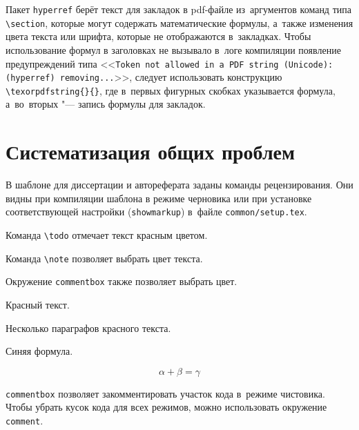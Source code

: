 Пакет \texttt{hyperref} берёт текст для закладок в pdf-файле из~аргументов
команд типа \verb|\section|, которые могут содержать математические формулы,
а~также изменения цвета текста или шрифта, которые не отображаются в~закладках.
Чтобы использование формул в заголовках не вызывало в~логе компиляции появление
предупреждений типа <<\texttt{Token not allowed in~a~PDF string
    (Unicode):(hyperref) removing...}>>, следует использовать конструкцию
\verb|\texorpdfstring{}{}|, где в~первых фигурных скобках указывается
формула, а~во~вторых "--- запись формулы для закладок.

\section{Систематизация общих проблем}\label{sec:markup}

В шаблоне для диссертации и автореферата заданы команды рецензирования.
Они видны при компиляции шаблона в режиме черновика или при установке
соответствующей настройки (\verb+showmarkup+) в~файле \verb+common/setup.tex+.

Команда \verb+\todo+ отмечает текст красным цветом.

Команда \verb+\note+ позволяет выбрать цвет текста.
  
 

Окружение \verb+commentbox+ также позволяет выбрать цвет.

\begin{commentbox}[red]
    Красный текст.

    Несколько параграфов красного текста.
\end{commentbox}

\begin{commentbox}[blue]
    Синяя формула.

    \begin{equation}
        \alpha + \beta = \gamma
    \end{equation}
\end{commentbox}

\verb+commentbox+ позволяет закомментировать участок кода в~режиме чистовика.
Чтобы убрать кусок кода для всех режимов, можно использовать окружение
\verb+comment+.

